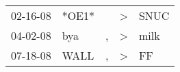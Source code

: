 \begin{supertabular}{lllll}
 02-16-08 &  *OE1* &    &  \textgreater &  SNUC \\
 04-02-08 &    bya &  , &  \textgreater &  milk \\
 07-18-08 &   WALL &  , &  \textgreater &    FF \\
\end{supertabular}
